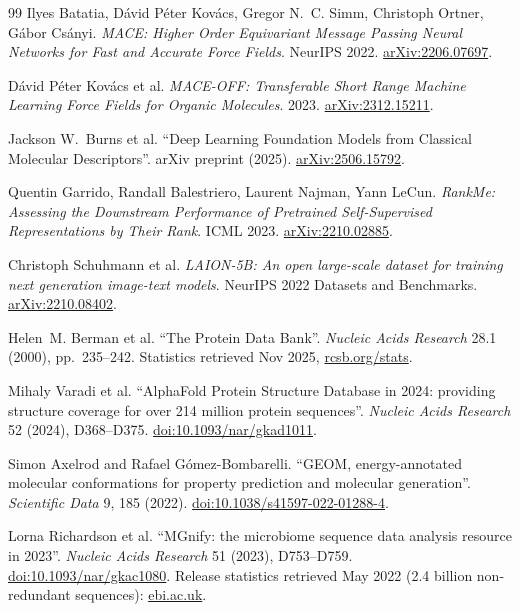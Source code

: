 \documentclass[12pt,a4paper,twoside]{report}
\begin{document}
\begin{thebibliography}{99}
Ilyes Batatia, D\'avid P\'eter Kov\'acs, Gregor N.~C. Simm, Christoph Ortner, G\'abor Cs\'anyi.
\textit{MACE: Higher Order Equivariant Message Passing Neural Networks for Fast and Accurate Force Fields}. NeurIPS 2022.
\href{https://arxiv.org/abs/2206.07697}{arXiv:2206.07697}.

D\'avid P\'eter Kov\'acs et al.
\textit{MACE-OFF: Transferable Short Range Machine Learning Force Fields for Organic Molecules}. 2023.
\href{https://arxiv.org/abs/2312.15211}{arXiv:2312.15211}.

Jackson W.~Burns et al.
``Deep Learning Foundation Models from Classical Molecular Descriptors''.
arXiv preprint (2025).
\href{https://arxiv.org/abs/2506.15792}{arXiv:2506.15792}.

Quentin Garrido, Randall Balestriero, Laurent Najman, Yann LeCun.
\textit{RankMe: Assessing the Downstream Performance of Pretrained Self-Supervised Representations by Their Rank}. ICML 2023.
\href{https://arxiv.org/abs/2210.02885}{arXiv:2210.02885}.


Christoph Schuhmann et al.
\textit{LAION-5B: An open large-scale dataset for training next generation image-text models}. NeurIPS 2022 Datasets and Benchmarks.
\href{https://arxiv.org/abs/2210.08402}{arXiv:2210.08402}.

Helen~M. Berman et al.
``The Protein Data Bank''.
\textit{Nucleic Acids Research} 28.1 (2000), pp.~235--242. Statistics retrieved Nov 2025, \href{https://www.rcsb.org/stats}{rcsb.org/stats}.

Mihaly Varadi et al.
``AlphaFold Protein Structure Database in 2024: providing structure coverage for over 214 million protein sequences''.
\textit{Nucleic Acids Research} 52 (2024), D368--D375.
\href{https://doi.org/10.1093/nar/gkad1011}{doi:10.1093/nar/gkad1011}.

Simon Axelrod and Rafael G\'omez-Bombarelli.
``GEOM, energy-annotated molecular conformations for property prediction and molecular generation''.
\textit{Scientific Data} 9, 185 (2022).
\href{https://doi.org/10.1038/s41597-022-01288-4}{doi:10.1038/s41597-022-01288-4}.

Lorna Richardson et al.
``MGnify: the microbiome sequence data analysis resource in 2023''.
\textit{Nucleic Acids Research} 51 (2023), D753--D759.
\href{https://doi.org/10.1093/nar/gkac1080}{doi:10.1093/nar/gkac1080}.
Release statistics retrieved May 2022 (2.4 billion non-redundant sequences):
\href{https://www.ebi.ac.uk/about/news/updates-from-data-resources/2-4-billion-sequences-now-available-in-the-latest-mgnify-protein-database-release/}{ebi.ac.uk}.


\end{thebibliography}
\end{document}
